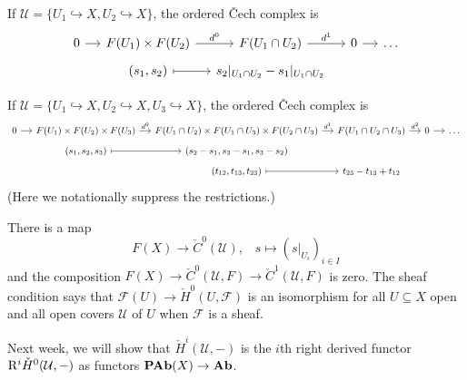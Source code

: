 \begin{exmp}
If \(\mathcal U=\{U_1\hookrightarrow X,U_2\hookrightarrow X\}\), the ordered Čech complex is
\begin{equation*}
  \begin{tikzcd}[row sep=tiny, column sep=small]
    0 \ar[r] & F(U_1) \times F(U_2) \ar[r, "d^0"] & F(U_1\cap U_2) \ar[r, "d^1"] & 0 \ar[r] & \ldots \\
    & {(s_1,s_2)} \ar[r, mapsto] & s_2|_{U_1\cap U_2}-s_1|_{U_1\cap U_2}
  \end{tikzcd}
\end{equation*}
\end{exmp}

\begin{exmp}
If \(\mathcal U=\{U_1\hookrightarrow X,U_2\hookrightarrow X,U_3\hookrightarrow X\}\), the ordered Čech complex is
\begin{equation*}
  \small
  \begin{tikzcd}[row sep=tiny, column sep=small]
    0 \ar[r] & F(U_1) \times F(U_2) \times F(U_3) \ar[r, "d^0"] & F(U_1\cap U_2) \times F(U_1\cap U_3) \times F(U_2\cap U_3) \ar[r, "d^1"] & F(U_1\cap U_2\cap U_3) \ar[r, "d^2"] & 0 \ar[r] & \ldots \\
    & {(s_1,s_2,s_3)} \ar[r, mapsto] & {(s_2-s_1,s_3-s_1,s_3-s_2)} \\
    & & {(t_{12},t_{13},t_{23})} \ar[r, mapsto] & t_{23}-t_{13}+t_{12}
  \end{tikzcd}
\end{equation*}
(Here we notationally suppress the restrictions.)
\end{exmp}

\begin{rmk}
There is a map
\[ F(X) \to \check{C}^0(\mathcal U)\text{,} \quad s\mapsto (s|_{U_i})_{i\in I} \]
and the composition \(F(X)\to\check{C}^0(\mathcal U,F)\to\check{C}^1(\mathcal U,F)\) is zero.
The sheaf condition says that \(\mathcal F(U)\to\check{H}^0(U,\mathcal F)\) is an isomorphism for all \(U\subseteq X\) open and all open covers \(\mathcal U\) of \(U\) when \(\mathcal F\) is a sheaf.
\end{rmk}

Next week, we will show that \(\check{H}^i(\mathcal U,-)\) is the \(i\)th right derived functor \(\mathrm{R}^i\check{H}^0(\mathcal U,-)\) as functors \(\operatorname{\mathbf{PAb}}(X)\to\mathbf{Ab}\).

